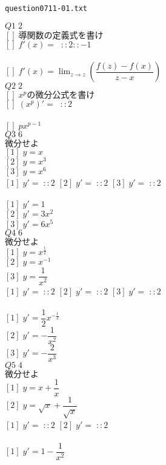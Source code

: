 \documentclass[10pt,dvipdfmx]{jarticle}
\begin{document}
\begin{center}
\verb|question0711-01.txt|\\
\end{center}

$Q1\;2$\\
$[]\;\text{導関数の定義式を書け}$\\
$[]\;f'(x)=\;\;::2::-1$ 
\\
\\
$[]\;f'(x)=\displaystyle\lim_{z \to z} (\dfrac{f(z)-f(x)}{z-x})$\\
$Q2\;2$\\
$[]\;x^p\text{の微分公式を書け}$\\
$[]\;(x^p)'=\;\;::2$ 
\\
\\
$[]\;px^{p-1}$\\
$Q3\;6$\\
$\text{微分せよ}$\\
$[1]\;y=x$\\
$[2]\;y=x^3$\\
$[3]\;y=x^6$\\
$[1]\;y'=\;::2$ 
$[2]\;y'=\;::2$ 
$[3]\;y'=\;::2$ 
\\
\\
$[1]\;y'=1$\\
$[2]\;y'=3x^2$\\
$[3]\;y'=6x^5$\\
$Q4\;6$\\
$\text{微分せよ}$\\
$[1]\;y=x^{\frac{1}{2}}$\\
$[2]\;y=x^{-1}$\\
$[3]\;y=\dfrac{1}{x^2}$\\
$[1]\;y'=\;::2$ 
$[2]\;y'=\;::2$ 
$[3]\;y'=\;::2$ 
\\
\\
$[1]\;y'=\dfrac{1}{2}x^{-\frac{1}{2}}$\\
$[2]\;y'=-\dfrac{1}{x^2}$\\
$[3]\;y'=-\dfrac{2}{x^3}$\\
$Q5\;4$\\
$\text{微分せよ}$\\
$[1]\;y=x+\dfrac{1}{x}$\\
$[2]\;y=\sqrt{x}+\dfrac{1}{\sqrt{x}}$\\
$[1]\;y'=\;::2$ 
$[2]\;y'=\;::2$ 
\\
\\
$[1]\;y'=1-\dfrac{1}{x^2}$\\
\end{document}
